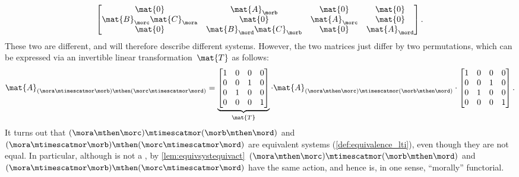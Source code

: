 \begin{example}
\begin{equation}
\begin{bmatrix}
            \mat{0}                     & \mat{A}_\morb               & \mat{0}       & \mat{0}       \\
            \mat{B}_\morc \mat{C}_\mora & \mat{0}                     & \mat{A}_\morc & \mat{0}       \\
            \mat{0}                     & \mat{B}_\mord \mat{C}_\morb & \mat{0}       & \mat{A}_\mord
        \end{bmatrix}.
    \end{equation}
    These two are different, and will therefore describe different systems.
    However, the two matrices just differ by two permutations, which can be expressed via an invertible linear transformation~$\mat{T}$ as follows:
    \begin{equation}\label{eq:checking-LTI-functorial-stacking-3}
        \mat{A}_{(\mora\mtimescatmor \morb)\mthen (\morc\mtimescatmor \mord)}=
        \underbrace{\begin{bmatrix}
                1 & 0 & 0 & 0 \\
                0 & 0 & 1 & 0 \\
                0 & 1 & 0 & 0 \\
                0 & 0 & 0 & 1
            \end{bmatrix}}_{\mat{T}}\cdot
        \mat{A}_{(\mora \mthen \morc)\mtimescatmor (\morb\mthen \mord)}
        \cdot
        \begin{bmatrix}
            1 & 0 & 0 & 0 \\
            0 & 0 & 1 & 0 \\
            0 & 1 & 0 & 0 \\
            0 & 0 & 0 & 1
        \end{bmatrix}.
    \end{equation}
    It turns out that $(\mora \mthen \morc)\mtimescatmor (\morb\mthen \mord)$ and~$(\mora\mtimescatmor \morb)\mthen (\morc\mtimescatmor \mord)$ are equivalent systems (\cref{def:equivalence_lti}), even though they are not equal.
    In particular, although \LTI is not a , by \cref{lem:equivsystequivact}~$(\mora \mthen \morc)\mtimescatmor (\morb\mthen \mord)$ and~$(\mora\mtimescatmor \morb)\mthen (\morc\mtimescatmor \mord)$ have the same action, and hence \LTI is, in one sense, ``morally'' functorial.
\end{example}

